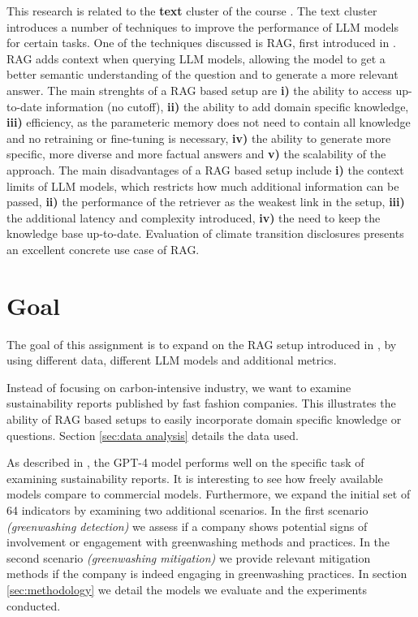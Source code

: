 \documentclass[]{article}
\begin{document}
This research is related to the \textbf{text} cluster of the course \cite{ou}.
The text cluster introduces a number of techniques to improve the performance of LLM models for certain tasks.
One of the techniques discussed is RAG, first introduced in \cite{rag}.
RAG adds context when querying LLM models, allowing the model to get a better semantic understanding of the question and to generate a more relevant answer.
The main strenghts of a RAG based setup are \textbf{i)} the ability to access up-to-date information (no cutoff), \textbf{ii)} the ability to add domain specific knowledge, \textbf{iii)} efficiency, as the parameteric memory does not need to contain all knowledge and no retraining or fine-tuning is necessary, \textbf{iv)} the ability to generate more specific, more diverse and more factual answers and \textbf{v)} the scalability of the approach.
The main disadvantages of a RAG based setup include \textbf{i)} the context limits of LLM models, which restricts how much additional information can be passed, \textbf{ii)} the performance of the retriever as the weakest link in the setup, \textbf{iii)} the additional latency and complexity introduced, \textbf{iv)} the need to keep the knowledge base up-to-date.
Evaluation of climate transition disclosures presents an excellent concrete use case of RAG.

\section{Goal} \label{sec:goal}

The goal of this assignment is to expand on the RAG setup introduced in \cite{durability}, by using different data, different LLM models and additional metrics.

Instead of focusing on carbon-intensive industry, we want to examine sustainability reports published by fast fashion companies.
This illustrates the ability of RAG based setups to easily incorporate domain specific knowledge or questions.
Section \ref{sec:data analysis} details the data used.

As described in \cite{durability}, the GPT-4 model performs well on the specific task of examining sustainability reports.
It is interesting to see how freely available models compare to commercial models.
Furthermore, we expand the initial set of 64 indicators by examining two additional scenarios.
In the first scenario \textit{(greenwashing detection)} we assess if a company shows potential signs of involvement or engagement with greenwashing methods and practices.
In the second scenario \textit{(greenwashing mitigation)} we provide relevant mitigation methods if the company is indeed engaging in greenwashing practices.
In section \ref{sec:methodology} we detail the models we evaluate and the experiments conducted.
\end{document}
